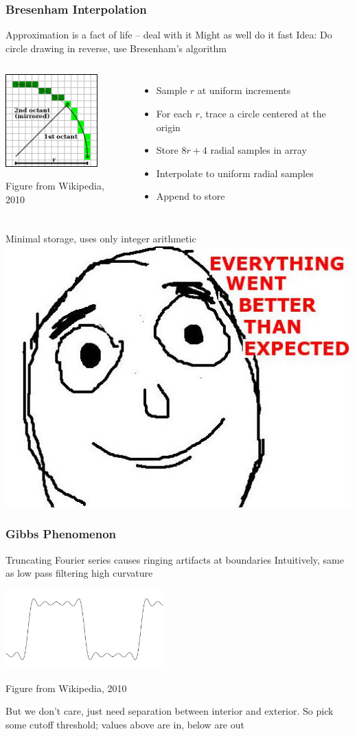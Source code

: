 \documentclass{beamer}
\begin{document}
\begin{frame}
\frametitle{Bresenham Interpolation}
Approximation is a fact of life -- deal with it
\vskip2pt
\hskip10pt {\small Might as well do it fast}
\vskip2pt
\pause
Idea: Do circle drawing in reverse, use Bresenham's algorithm
\begin{columns}

		\begin{center}
		\includegraphics[height=1.4in]{figures/wiki_bresenham.png}

		{\tiny Figure from Wikipedia, 2010}
		\end{center}
		
		\pause
		\begin{itemize}
			\item Sample $r$ at uniform increments
			\item For each $r$, trace a circle centered at the origin
			\item Store $8r + 4$ radial samples in array
			\item Interpolate to uniform radial samples
			\item Append to store
		\end{itemize}
\end{columns}
\pause
Minimal storage, uses only integer arithmetic \includegraphics[height=.5in]{figures/everything_went_better_than_expected.jpg}
\end{frame}

\begin{frame}
\frametitle{Gibbs Phenomenon}
Truncating Fourier series causes ringing artifacts at boundaries
\vskip2pt
\hskip10pt {\small Intuitively, same as low pass filtering high curvature}
\begin{center}
\includegraphics[height=1.2in]{figures/wiki_gibbs.png}

{\tiny Figure from Wikipedia, 2010}
\end{center}
\pause
But we don't care, just need separation between interior and exterior.
\vskip5pt
So pick some cutoff threshold; values above are in, below are out
\end{frame}
\end{document}
